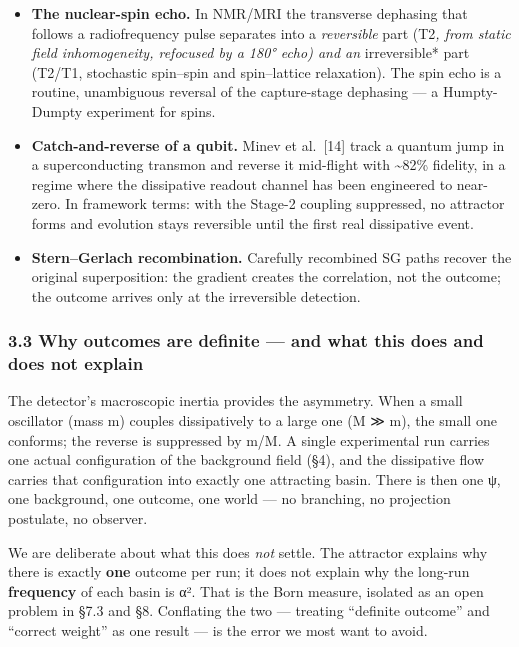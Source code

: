\documentclass[
]{article}
\providecommand{\tightlist}{%
  \setlength{\itemsep}{0pt}\setlength{\parskip}{0pt}}
\begin{document}
\begin{itemize}
\tightlist
\item
  \textbf{The nuclear-spin echo.} In NMR/MRI the transverse dephasing
  that follows a radiofrequency pulse separates into a \emph{reversible}
  part (T2\emph{, from static field inhomogeneity, refocused by a 180°
  echo) and an }irreversible* part (T2/T1, stochastic spin--spin and
  spin--lattice relaxation). The spin echo is a routine, unambiguous
  reversal of the capture-stage dephasing --- a Humpty-Dumpty experiment
  for spins.
\item
  \textbf{Catch-and-reverse of a qubit.} Minev et al.~{[}14{]} track a
  quantum jump in a superconducting transmon and reverse it mid-flight
  with \textasciitilde82\% fidelity, in a regime where the dissipative
  readout channel has been engineered to near-zero. In framework terms:
  with the Stage-2 coupling suppressed, no attractor forms and evolution
  stays reversible until the first real dissipative event.
\item
  \textbf{Stern--Gerlach recombination.} Carefully recombined SG paths
  recover the original superposition: the gradient creates the
  correlation, not the outcome; the outcome arrives only at the
  irreversible detection.
\end{itemize}

\subsubsection{3.3 Why outcomes are definite --- and what this does and
does not
explain}\label{why-outcomes-are-definite-and-what-this-does-and-does-not-explain}

The detector's macroscopic inertia provides the asymmetry. When a small
oscillator (mass m) couples dissipatively to a large one (M ≫ m), the
small one conforms; the reverse is suppressed by m/M. A single
experimental run carries one actual configuration of the background
field (§4), and the dissipative flow carries that configuration into
exactly one attracting basin. There is then one ψ, one background, one
outcome, one world --- no branching, no projection postulate, no
observer.

We are deliberate about what this does \emph{not} settle. The attractor
explains why there is exactly \textbf{one} outcome per run; it does not
explain why the long-run \textbf{frequency} of each basin is
\textbar α\textbar². That is the Born measure, isolated as an open
problem in §7.3 and §8. Conflating the two --- treating ``definite
outcome'' and ``correct weight'' as one result --- is the error we most
want to avoid.
\end{document}

